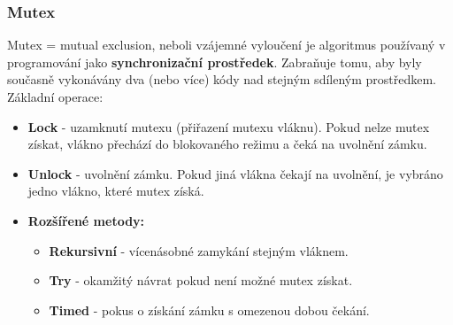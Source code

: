 \subsubsection{Mutex}
Mutex = mutual exclusion, neboli vzájemné vyloučení je algoritmus používaný v programování jako \textbf{synchronizační prostředek}. Zabraňuje tomu, aby byly současně vykonávány dva (nebo více) kódy nad stejným sdíleným prostředkem. Základní operace:
\begin{itemize}
	\item \textbf{Lock} - uzamknutí mutexu (přiřazení mutexu vláknu). Pokud nelze mutex získat, vlákno přechází do blokovaného režimu a čeká na uvolnění zámku.
	\item \textbf{Unlock} - uvolnění zámku. Pokud jiná vlákna čekají na uvolnění, je vybráno jedno vlákno, které mutex získá.
	\item \textbf{Rozšířené metody:}
	\begin{itemize}
		\item \textbf{Rekursivní} - vícenásobné zamykání stejným vláknem.
		\item \textbf{Try} - okamžitý návrat pokud není možné mutex získat.
		\item \textbf{Timed} - pokus o získání zámku s omezenou dobou čekání.
	\end{itemize}
\end{itemize}